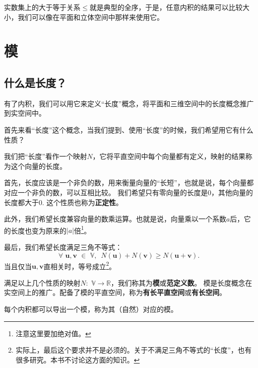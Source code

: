 \documentclass[12pt,UTF8]{ctexbook}
\begin{document}
实数集上的大于等于关系$\leqslant$就是典型的全序，于是，任意内积的结果可以比较大小，我们可以像在平面和立体空间中那样来使用它。

\section{模}
\subsection{什么是长度？}
有了内积，我们可以用它来定义“长度”概念，将平面和三维空间中的长度概念推广到实空间中。

首先来看“长度”这个概念，当我们提到、使用“长度”的时候，我们希望用它有什么性质？

我们把“长度”看作一个映射$N$，它将平直空间中每个向量都有定义，映射的结果称为这个向量的长度。

首先，长度应该是一个非负的数，用来衡量向量的“长短”，也就是说，每个向量都对应一个非负的数，可以互相比较。
我们希望只有零向量的长度是0，其他向量的长度都大于0.
这个性质也称为\textbf{正定性}。

此外，我们希望长度兼容向量的数乘运算。也就是说，向量乘以一个系数$a$后，它的长度也变为原来的$|a|$倍\footnote{注意这里要加绝对值。}。

最后，我们希望长度满足三角不等式：
$$ \forall \,\, \mathbf{u}, \mathbf{v}  \,\, \in \,\, \mathbb{V}, \,\,\, N(\mathbf{u}) + N(\mathbf{v}) \geqslant N(\mathbf{u}+\mathbf{v}). $$
当且仅当$\mathbf{u}, \mathbf{v}$直相关时，等号成立\footnote{实际上，最后这个要求并不是必须的。关于不满足三角不等式的“长度”，也有很多研究。本书不讨论这方面的知识。}。

满足以上几个性质的映射$N : \,\, \mathbb{V} \rightarrow \mathbb{R}$，我们称其为\textbf{模}或\textbf{范定义数}。
模是长度概念在实空间上的推广。配备了模的平直空间，称为\textbf{有长平直空间}或\textbf{有长空间}。

\begin{pp}\label{pp:7_1}
    每个内积都可以导出一个模，称为其（自然）对应的模。
\end{pp}
\end{document}
